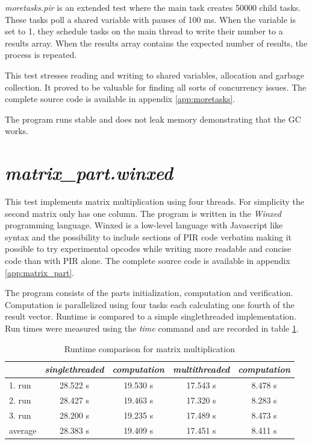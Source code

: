 \documentclass[bachelor,english]{hgbthesis}
\begin{document}
\textit{moretasks.pir} is an extended test where the main task creates 50000 child tasks. These tasks poll a shared variable with pauses of 100 ms. When the variable is set to 1, they schedule tasks on the main thread to write their number to a results array. When the results array contains the expected number of results, the process is repeated.

This test stresses reading and writing to shared variables, allocation and garbage collection. It proved to be valuable for finding all sorts of concurrency issues. The complete source code is available in appendix \ref{app:moretasks}.

The program runs stable and does not leak memory demonstrating that the GC works.

\section{\textit{matrix\_part.winxed}}

This test implements matrix multiplication \cite{MatrixMult} using four threads. For simplicity the second matrix only has one column. The program is written in the \textit{Winxed} programming language. Winxed is a low-level language with Javascript like syntax and the possibility to include sections of PIR code verbatim making it possible to try experimental opcodes while writing more readable and concise code than with PIR alone. The complete source code is available in appendix \ref{app:matrix_part}.

The program consists of the parts initialization, computation and verification. Computation is parallelized using four tasks each calculating one fourth of the result vector. Runtime is compared to a simple singlethreaded implementation. Run times were measured using the \textit{time} command and are recorded in table \ref{benchmark:matrix}.

\begin{table}
\caption{Runtime comparison for matrix multiplication}
\label{benchmark:matrix}
\begin{tabular}{|l||c|c||c|c|} \hline
& \emph{singlethreaded} & \emph{computation} & \emph{multithreaded} & \emph{computation} \\
\hline
1. run  & 28.522 s & 19.530 s & 17.543 s & 8.478 s \\
\hline
2. run  & 28.427 s & 19.463 s & 17.320 s & 8.283 s \\
\hline
3. run  & 28.200 s & 19.235 s & 17.489 s & 8.473 s \\
\hline
average & 28.383 s & 19.409 s & 17.451 s & 8.411 s \\
\hline
\end{tabular}
\end{table}
\end{document}
